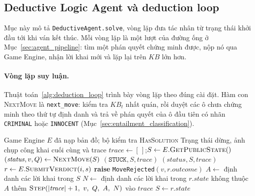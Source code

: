 \subsection{Deductive Logic Agent và deduction loop}
\label{sec:deductive_agent}
\begin{sloppypar}

Mục này mô tả \texttt{DeductiveAgent.solve}, vòng lặp đưa tác nhân từ trạng
thái khởi đầu tới khi ván kết thúc. Mỗi vòng lặp là một lượt của đường ống ở
Mục~\ref{sec:agent_pipeline}: tìm một phán quyết chứng minh được, nộp nó qua
Game Engine, nhận lời khai mới và lặp lại trên $\mathit{KB}$ lớn hơn.

\paragraph{Vòng lặp suy luận.}
Thuật toán~\ref{alg:deduction_loop} trình bày vòng lặp theo đúng cài đặt.
Hàm con \textsc{NextMove} là \texttt{next\_move}: kiểm tra $\mathit{KB}_t$ nhất
quán, rồi duyệt các ô chưa chứng minh theo thứ tự định danh và trả về phán
quyết của ô đầu tiên có nhãn \texttt{CRIMINAL} hoặc \texttt{INNOCENT}
(Mục~\ref{sec:entailment_classification}).

\begin{algorithm}[htbp]
  \caption{Vòng lặp suy luận \texttt{DeductiveAgent.solve}}
  \label{alg:deduction_loop}
  \begin{algorithmic}[1]
    \Require Game Engine $E$ đã nạp bản đồ; bộ kiểm tra \textsc{HasSolution}
    \Ensure Trạng thái dừng, ảnh chụp công khai cuối cùng và trace
    \State $\mathit{trace} \gets [\,]$;\quad $S \gets E.\textsc{GetPublicState}()$
    \Loop
      \State $(\mathit{status}, v, Q) \gets \textsc{NextMove}(S)$
          \State \Return $(\texttt{STUCK}, S, \mathit{trace})$
        \EndIf
        \State \Return $(\mathit{status}, S, \mathit{trace})$
      \EndIf
      \State $r \gets E.\textsc{SubmitVerdict}(i, s)$
        \State \textbf{raise} \texttt{MoveRejected}$(v, r.\mathit{outcome})$
      \EndIf
      \State $A \gets$ định danh các lời khai trong $S$
      \State $N \gets$ định danh các lời khai trong $r.\mathit{state}$ không thuộc $A$
      \State thêm $\textsc{Step}(|\mathit{trace}|+1,\ v,\ Q,\ A,\ N)$ vào $\mathit{trace}$
      \State $S \gets r.\mathit{state}$
    \EndLoop
  \end{algorithmic}
\end{algorithm}


\end{sloppypar}
